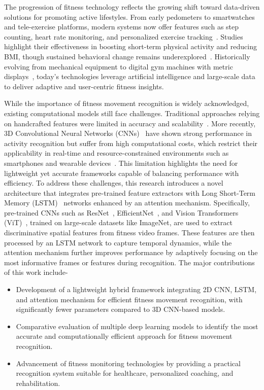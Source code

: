 \documentclass[conference]{IEEEtran}
\begin{document}
The progression of fitness technology reflects the growing shift toward data-driven solutions for promoting active lifestyles. From early pedometers to smartwatches and tele-exercise platforms, modern systems now offer features such as step counting, heart rate monitoring, and personalized exercise tracking~\cite{ref9}. Studies highlight their effectiveness in boosting short-term physical activity and reducing BMI, though sustained behavioral change remains underexplored~\cite{ref10}. Historically evolving from mechanical equipment to digital gym machines with metric displays~\cite{ref12}, today’s technologies leverage artificial intelligence and large-scale data to deliver adaptive and user-centric fitness insights.

While the importance of fitness movement recognition is widely acknowledged, existing computational models still face challenges. Traditional approaches relying on handcrafted features were limited in accuracy and scalability~\cite{ref15}. More recently, 3D Convolutional Neural Networks (CNNs)~\cite{cnn} have shown strong performance in activity recognition but suffer from high computational costs, which restrict their applicability in real-time and resource-constrained environments such as smartphones and wearable devices~\cite{ref16}. This limitation highlights the need for lightweight yet accurate frameworks capable of balancing performance with efficiency. To address these challenges, this research introduces a novel architecture that integrates pre-trained feature extractors with Long Short-Term Memory (LSTM)~\cite{lstm} networks enhanced by an attention mechanism. Specifically, pre-trained CNNs such as ResNet~\cite{resnet}, EfficientNet~\cite{efficientnet}, and Vision Transformers (ViT)~\cite{vit}, trained on large-scale datasets like ImageNet, are used to extract discriminative spatial features from fitness video frames. These features are then processed by an LSTM network to capture temporal dynamics, while the attention mechanism further improves performance by adaptively focusing on the most informative frames or features during recognition. The major contributions of this work include-
\begin{itemize}
\item Development of a lightweight hybrid framework integrating 2D CNN, LSTM, and attention mechanism for efficient fitness movement recognition, with significantly fewer parameters compared to 3D CNN-based models.

\item Comparative evaluation of multiple deep learning models to identify the most accurate and computationally efficient approach for fitness movement recognition.

\item Advancement of fitness monitoring technologies by providing a practical recognition system suitable for healthcare, personalized coaching, and rehabilitation.
\end{itemize}
\end{document}
